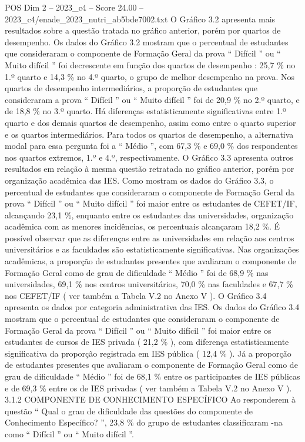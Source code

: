 \begin{textsample}{POS Dim 2 – 2023\_c4 – Score 24.00 – 2023\_c4/enade\_2023\_nutri\_ab5bde7002.txt}
O Gráfico 3.2 apresenta mais resultados sobre a questão tratada no gráfico anterior, porém por quartos de desempenho.
Os dados do Gráfico 3.2 mostram que o percentual de estudantes que consideraram o componente de Formação Geral da prova “ Difícil ” ou “ Muito difícil ” foi decrescente em função dos quartos de desempenho : 25,7 \% no 1.º quarto e 14,3 \% no 4.º quarto, o grupo de melhor desempenho na prova.
Nos quartos de desempenho intermediários, a proporção de estudantes que consideraram a prova “ Difícil ” ou “ Muito difícil ” foi de 20,9 \% no 2.º quarto, e de 18,8 \% no 3.º quarto.
Há diferenças estatisticamente significativas entre 1.º quarto e dos demais quartos de desempenho, assim como entre o quarto superior e os quartos intermediários.
Para todos os quartos de desempenho, a alternativa modal para essa pergunta foi a “ Médio ”, com 67,3 \% e 69,0 \% dos respondentes nos quartos extremos, 1.º e 4.º, respectivamente.
O Gráfico 3.3 apresenta outros resultados em relação à mesma questão retratada no gráfico anterior, porém por organização acadêmica das IES.
Como mostram os dados do Gráfico 3.3, o percentual de estudantes que consideraram o componente de Formação Geral da prova “ Difícil ” ou “ Muito difícil ” foi maior entre os estudantes de CEFET/IF, alcançando 23,1 \%, enquanto entre os estudantes das universidades, organização acadêmica com as menores incidências, os percentuais alcançaram 18,2 \%.
É possível observar que as diferenças entre as universidades em relação aos centros universitários e as faculdades são estatisticamente significativas.
Nas organizações acadêmicas, a proporção de estudantes presentes que avaliaram o componente de Formação Geral como de grau de dificuldade “ Médio ” foi de 68,9 \% nas universidades, 69,1 \% nos centros universitários, 70,0 \% nas faculdades e 67,7 \% nos CEFET/IF ( ver também a Tabela V.2 no Anexo V ).
O Gráfico 3.4 apresenta os dados por categoria administrativa das IES.
Os dados do Gráfico 3.4 mostram que o percentual de estudantes que consideraram o componente de Formação Geral da prova “ Difícil ” ou “ Muito difícil ” foi maior entre os estudantes de cursos de IES privada ( 21,2 \% ), com diferença estatisticamente significativa da proporção registrada em IES pública ( 12,4 \% ).
Já a proporção de estudantes presentes que avaliaram o componente de Formação Geral como de grau de dificuldade “ Médio ” foi de 68,1 \% entre os participantes de IES públicas e de 69,3 \% entre os de IES privadas ( ver também a Tabela V.2 no Anexo V ). 3.1.2 COMPONENTE DE CONHECIMENTO ESPECÍFICO Ao responderem à questão “ Qual o grau de dificuldade das questões do componente de Conhecimento Específico? ”, 23,8 \% do grupo de estudantes classificaram -na como “ Difícil ” ou “ Muito difícil ”.

\end{textsample}
